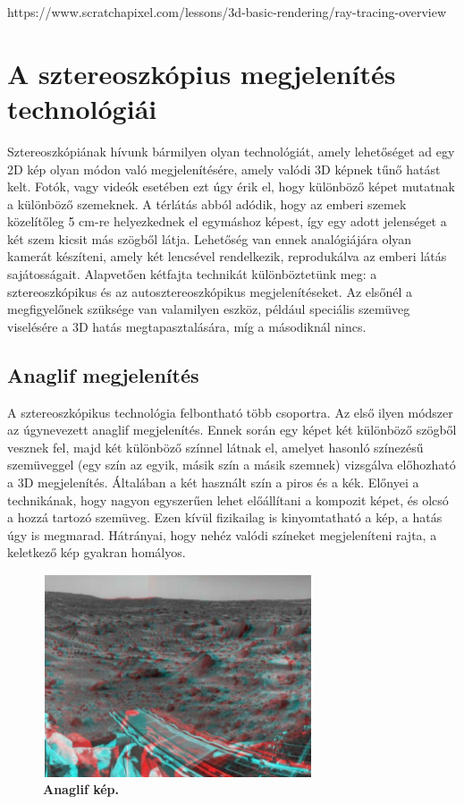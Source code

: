 \documentclass[12pt]{article}
\theoremstyle{plain}
\begin{document}
https://www.scratchapixel.com/lessons/3d-basic-rendering/ray-tracing-overview
 
  
\section{A sztereoszkópius megjelenítés technológiái}

Sztereoszkópiának hívunk bármilyen olyan technológiát, amely lehetőséget ad egy 2D kép olyan módon való megjelenítésére, amely valódi 3D képnek tűnő hatást kelt. Fotók, vagy videók esetében ezt úgy érik el, hogy különböző képet mutatnak a különböző szemeknek. \newline
A térlátás abból adódik, hogy az emberi szemek közelítőleg 5 cm-re helyezkednek el egymáshoz képest, így egy adott jelenséget a két szem kicsit más szögből látja. Lehetőség van ennek analógiájára olyan kamerát készíteni, amely két lencsével rendelkezik, reprodukálva az emberi látás sajátosságait. Alapvetően kétfajta technikát különböztetünk meg: a sztereoszkópikus és az autosztereoszkópikus megjelenítéseket. Az elsőnél a megfigyelőnek szüksége van valamilyen eszköz, például speciális szemüveg viselésére a 3D hatás megtapasztalására, míg a másodiknál nincs. \newline
\subsection{Anaglif megjelenítés}
A sztereoszkópikus technológia felbontható több csoportra. Az első ilyen módszer az úgynevezett anaglif megjelenítés. Ennek során egy képet két különböző szögből vesznek fel, majd két különböző színnel látnak el, amelyet hasonló színezésű szemüveggel (egy szín az egyik, másik szín a másik szemnek) vizsgálva előhozható a 3D megjelenítés. Általában a két használt szín a piros és a kék. Előnyei a technikának, hogy nagyon egyszerűen lehet előállítani a kompozit képet, és olcsó a hozzá tartozó szemüveg. Ezen kívül fizikailag is kinyomtatható a kép, a hatás úgy is megmarad. Hátrányai, hogy nehéz valódi színeket megjeleníteni rajta, a keletkező kép gyakran homályos.

\begin{figure}[H]
    \centering
    \includegraphics[width=8cm, height=6cm]{media/stereo.PNG}
    \caption{\textbf{Anaglif kép.}}
    \label{fig:GeneralDiagram}
 \end{figure}
\end{document}
